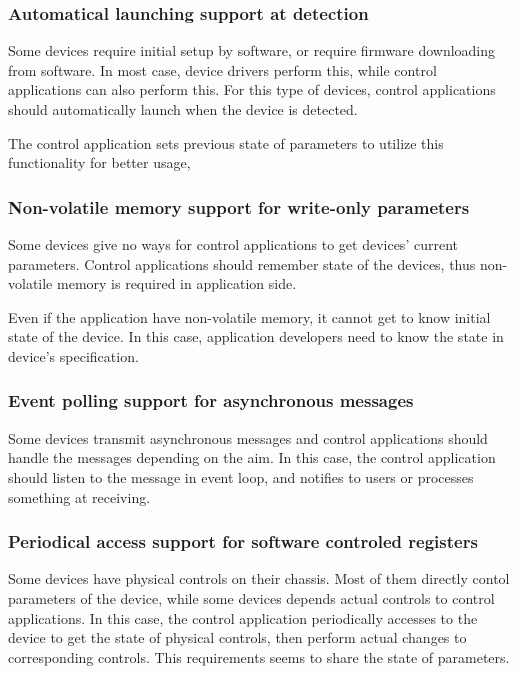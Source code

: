 \documentclass[onecolumn]{article}
\begin{document}
\subsubsection{Automatical launching support at detection}

Some devices require initial setup by software, or require firmware downloading from software. In most case, device drivers perform this, while control applications can also perform this. For this type of devices, control applications should automatically launch when the device is detected.

The control application sets previous state of parameters to utilize this functionality for better usage,


\subsubsection{Non-volatile memory support for write-only parameters}

Some devices give no ways for control applications to get devices' current parameters. Control applications should remember state of the devices, thus non-volatile memory is required in application side.

Even if the application have non-volatile memory, it cannot get to know initial state of the device. In this case, application developers need to know the state in device's specification.


\subsubsection{Event polling support for asynchronous messages}

Some devices transmit asynchronous messages and control applications should handle the messages depending on the aim. In this case, the control application should listen to the message in event loop, and notifies to users or processes something at receiving.


\subsubsection{Periodical access support for software controled registers}

Some devices have physical controls on their chassis. Most of them directly contol parameters of the device, while some devices depends actual controls to control applications. In this case, the control application periodically accesses to the device to get the state of physical controls, then perform actual changes to corresponding controls. This requirements seems to share the state of parameters.
\end{document}
